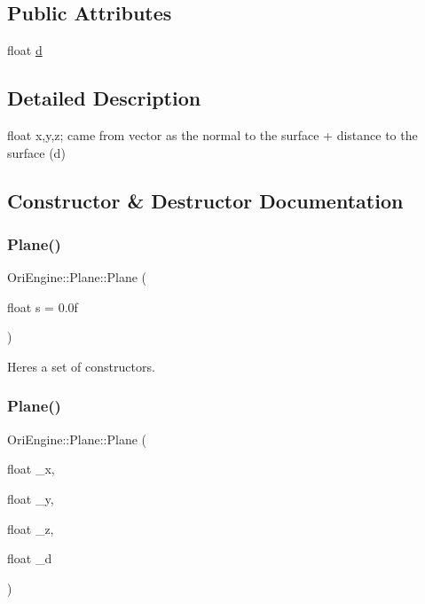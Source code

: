 \subsection*{Public Attributes}
\begin{DoxyCompactItemize}
\item 
float \hyperlink{struct_ori_engine_1_1_plane_aa810584e42c4223d18fec10d4099a9eb}{d}
\end{DoxyCompactItemize}


\subsection{Detailed Description}
float x,y,z; came from vector as the normal to the surface + distance to the surface (d) 

\subsection{Constructor \& Destructor Documentation}
\hypertarget{struct_ori_engine_1_1_plane_a94deefa0a982b77ea7ad882337e06b84}{}\label{struct_ori_engine_1_1_plane_a94deefa0a982b77ea7ad882337e06b84} 
\subsubsection{\texorpdfstring{Plane()}{Plane()}\hspace{0.1cm}{\footnotesize\ttfamily [1/4]}}
{\footnotesize\ttfamily Ori\+Engine\+::\+Plane\+::\+Plane (\begin{DoxyParamCaption}\item[{float}]{s = {\ttfamily 0.0f} }\end{DoxyParamCaption})\hspace{0.3cm}{\ttfamily [inline]}}



Here\textquotesingle{}s a set of constructors. 

\hypertarget{struct_ori_engine_1_1_plane_afdd998df2694dd0861a9c5f352125a04}{}\label{struct_ori_engine_1_1_plane_afdd998df2694dd0861a9c5f352125a04} 
\subsubsection{\texorpdfstring{Plane()}{Plane()}\hspace{0.1cm}{\footnotesize\ttfamily [2/4]}}
{\footnotesize\ttfamily Ori\+Engine\+::\+Plane\+::\+Plane (\begin{DoxyParamCaption}\item[{float}]{\+\_\+x,  }\item[{float}]{\+\_\+y,  }\item[{float}]{\+\_\+z,  }\item[{float}]{\+\_\+d }\end{DoxyParamCaption})\hspace{0.3cm}{\ttfamily [inline]}}


